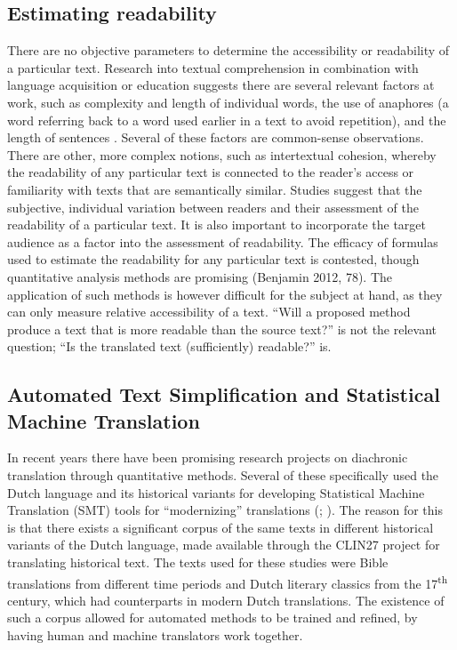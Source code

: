 \begin{paper}
\subsection{Estimating readability}

There are no objective parameters to determine the accessibility or
readability of a particular text. Research into textual comprehension in
combination with language acquisition or education suggests there are
several relevant factors at work, such as complexity and length of
individual words, the use of anaphores (a word referring back to a word
used earlier in a text to avoid repetition), and the length of sentences \citep[64]{benjamin_reconstructing_2012}. Several of these factors are common-sense
observations. There are other, more complex notions, such as
intertextual cohesion, whereby the readability of any particular text is
connected to the reader's access or familiarity with texts that are
semantically similar. Studies suggest that the subjective, individual
variation between readers and their assessment of the readability of a
particular text. It is also important to incorporate the target audience
as a factor into the assessment of readability. The efficacy of formulas
used to estimate the readability for any particular text is contested,
though quantitative analysis methods are promising (Benjamin 2012, 78).
The application of such methods is however difficult for the subject at
hand, as they can only measure relative accessibility of a text. ``Will a
proposed method produce a text that is more readable than the source
text?'' is not the relevant question; ``Is the translated text
(sufficiently) readable?'' is.

\subsection{Automated Text Simplification and Statistical Machine
Translation}

In recent years there have been promising research projects on
diachronic translation through quantitative methods. Several of these
specifically used the Dutch language and its historical variants for
developing Statistical Machine Translation (SMT) tools for ``modernizing''
translations (\citealt[55]{tjong_kim_sang_clin27_2017}; \citealt[299]{domingo_historical_2017}). The reason
for this is that there exists a significant corpus of the same texts in
different historical variants of the Dutch language, made available
through the CLIN27 project for translating historical text. The texts
used for these studies were Bible translations from different time
periods and Dutch literary classics from the 17\textsuperscript{th} century, which had
counterparts in modern Dutch translations. The existence of such a
corpus allowed for automated methods to be trained and refined, by
having human and machine translators work together.


\end{paper}
